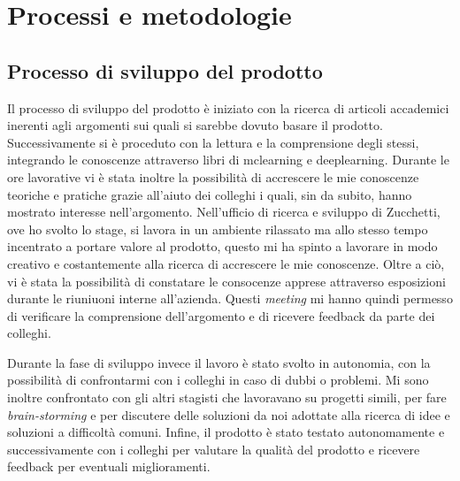 \chapter{Processi e metodologie}
\label{chap:processi-metodologie}

\section{Processo di sviluppo del prodotto}
Il processo di sviluppo del prodotto è iniziato con la ricerca di articoli accademici inerenti agli argomenti sui quali si sarebbe dovuto basare il prodotto. Successivamente si è proceduto con la lettura e la comprensione degli stessi, integrando le conoscenze attraverso libri di \gls{mclearning} e \gls{deeplearning}.
Durante le ore lavorative vi è stata inoltre la possibilità di accrescere le mie conoscenze teoriche e pratiche grazie all'aiuto dei colleghi i quali, sin da subito, hanno mostrato interesse nell'argomento.
Nell'ufficio di ricerca e sviluppo di Zucchetti, ove ho svolto lo stage, si lavora in un ambiente rilassato ma allo stesso tempo incentrato a portare valore al prodotto, questo mi ha spinto a lavorare in modo creativo e costantemente alla ricerca di accrescere le mie conoscenze.
Oltre a ciò, vi è stata la possibilità di constatare le consocenze apprese attraverso esposizioni durante le riuniuoni interne all'azienda. Questi \textit{meeting} mi hanno quindi permesso di verificare la comprensione dell'argomento e di ricevere feedback da parte dei colleghi.

Durante la fase di sviluppo invece il lavoro è stato svolto in autonomia, con la possibilità di confrontarmi con i colleghi in caso di dubbi o problemi.
Mi sono inoltre confrontato con gli altri stagisti che lavoravano su progetti simili, per fare \textit{brain-storming} e per discutere delle soluzioni da noi adottate alla ricerca di idee e soluzioni a difficoltà comuni.
Infine, il prodotto è stato testato autonomamente e successivamente con i colleghi per valutare la qualità del prodotto e ricevere feedback per eventuali miglioramenti.


